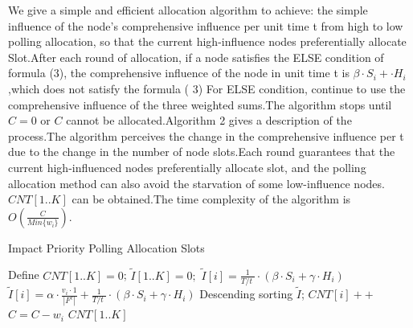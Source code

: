 \documentclass[conference,compsoc]{IEEEtran}
\begin{document}
We give a simple and efficient allocation algorithm to achieve: the simple influence of the node's comprehensive influence per unit time t from high to low polling allocation, so that the current high-influence nodes preferentially allocate Slot.After each round of allocation, if a node satisfies the ELSE condition of formula (3), the comprehensive influence of the node in unit time t is $\beta \cdot S_i + \cdot H_i$,which does not satisfy the formula ( 3) For ELSE condition, continue to use the comprehensive influence of the three weighted sums.The algorithm stops until $C = 0$ or $C$ cannot be allocated.Algorithm 2 gives a description of the process.The algorithm perceives the change in the comprehensive influence per t due to the change in the number of node slots.Each round guarantees that the current high-influenced nodes preferentially allocate slot, and the polling allocation method can also avoid the starvation of some low-influence nodes. $CNT[1..K]$ can be obtained.The time complexity of the algorithm is $O(\frac{C}{Min\{w_i\}})$.


\begin{algorithm}[h]
\caption{Impact Priority Polling Allocation Slots}
\begin{algorithmic}[1]
\STATE Define $CNT[1..K] = 0$;   $\widetilde{I}[1..K] = 0;$
\STATE  $ \widetilde{I}[i]  = \frac{1}{{T}/{t}\;}\cdot (\beta \cdot {{S}_{i}}+\gamma \cdot {{H}_{i}})$ 
\ELSE 
\STATE  $ \widetilde{I}[i]  = \alpha \cdot \frac{{{v}_{i}\cdot 1}}{\left| {{F}^{c}} \right|}+\frac{1}{{T}/{t}\;} \cdot (\beta \cdot {{S}_{i}}+\gamma \cdot {{H}_{i}})$
\ENDIF
\ENDFOR
\STATE Descending sorting $ \widetilde{I}  $;
\STATE $CNT[i]++$
\STATE $C = C - w_i $
\ENDIF
\ENDFOR
\ENDWHILE
\RETURN $CNT[1..K]$
\label{code:recentEnd}
\end{algorithmic}
\end{algorithm}
\end{document}
